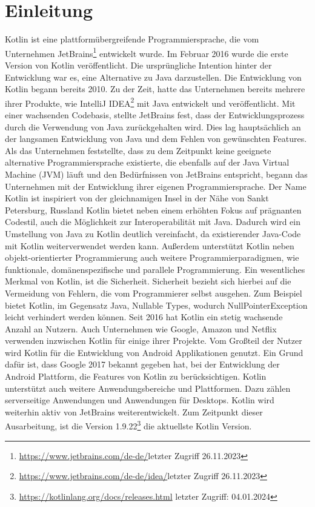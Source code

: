 \documentclass{article}
\begin{document}
\section{Einleitung}
Kotlin ist eine plattformübergreifende Programmiersprache, die vom Unternehmen JetBrains\footnote{\url{https://www.jetbrains.com/de-de/}letzter Zugriff 26.11.2023} entwickelt wurde. Im Februar 2016 wurde die erste Version von Kotlin veröffentlicht. Die ursprüngliche Intention hinter der Entwicklung war es, eine Alternative zu Java darzustellen. Die Entwicklung von Kotlin begann bereits 2010. Zu der Zeit, hatte das Unternehmen bereits mehrere ihrer Produkte, wie IntelliJ IDEA\footnote{\url{https://www.jetbrains.com/de-de/idea/}letzter Zugriff 26.11.2023} mit Java entwickelt und veröffentlicht. Mit einer wachsenden Codebasis, stellte JetBrains fest, dass der Entwicklungsprozess durch die Verwendung von Java zurückgehalten wird. Dies lag hauptsächlich an der langsamen Entwicklung von Java und dem Fehlen von gewünschten Features. Als das Unternehmen feststellte, dass zu dem Zeitpunkt keine geeignete alternative Programmiersprache existierte, die ebenfalls auf der Java Virtual Machine (JVM) läuft und den Bedürfnissen von JetBrains entspricht, begann das Unternehmen mit der Entwicklung ihrer eigenen Programmiersprache. Der Name Kotlin ist inspiriert von der gleichnamigen Insel in der Nähe von Sankt Petersburg, Russland\cite{Kotlin_In-D} \newline
Kotlin bietet neben einem erhöhten Fokus auf prägnanten Codestil, auch die Möglichkeit zur Interoperabilität mit Java. Dadurch wird ein Umstellung von Java zu Kotlin deutlich vereinfacht, da existierender Java-Code mit Kotlin weiterverwendet werden kann. Außerdem unterstützt Kotlin neben objekt-orientierter Programmierung auch weitere Programmierparadigmen, wie funktionale, domänenspezifische und parallele Programmierung. Ein wesentliches Merkmal von Kotlin, ist die Sicherheit. Sicherheit bezieht sich hierbei auf die Vermeidung von Fehlern, die vom Programmierer selbst ausgehen. Zum Beispiel bietet Kotlin, im Gegensatz Java, Nullable Types, wodurch NullPointerException leicht verhindert werden können. Seit 2016 hat Kotlin ein stetig wachsende Anzahl an Nutzern. Auch Unternehmen wie Google, Amazon und Netflix verwenden inzwischen Kotlin für einige ihrer Projekte. Vom Großteil der Nutzer wird Kotlin für die Entwicklung von Android Applikationen genutzt. Ein Grund dafür ist, dass Google 2017 bekannt gegeben hat, bei der Entwicklung der Android Plattform, die Features von Kotlin zu berücksichtigen. Kotlin unterstützt auch weitere Anwendungsbereiche und Plattformen. Dazu zählen serverseitige Anwendungen und Anwendungen für Desktops. Kotlin wird weiterhin aktiv von JetBrains weiterentwickelt. Zum Zeitpunkt dieser Ausarbeitung, ist die Version 1.9.22\footnote{\url{https://kotlinlang.org/docs/releases.html} letzter Zugriff: 04.01.2024} die aktuellste Kotlin Version. \cite{Kotlin_In-D}
\end{document}
